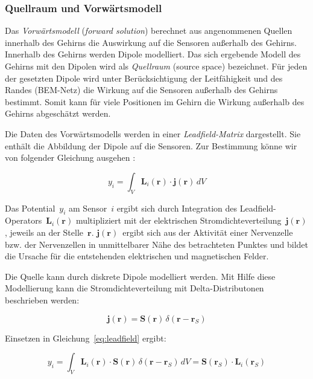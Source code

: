 \documentclass[doc,a4paper,12pt]{apa6}
\newcommand{\mx}[1]{\mathbf{#1}}
\begin{document}
\subsubsection{Quellraum und Vorwärtsmodell}

Das \emph{Vorwärtsmodell} (\emph{forward solution}) berechnet aus angenommenen Quellen innerhalb des Gehirns die Auswirkung auf die Sensoren außerhalb des Gehirns. Innerhalb des Gehirns werden Dipole modelliert. Das sich ergebende Modell des Gehirns mit den Dipolen wird als \emph{Quellraum} (source space) bezeichnet. Für jeden der gesetzten Dipole wird unter Berücksichtigung der Leitfähigkeit und des Randes (BEM-Netz) die Wirkung auf die Sensoren außerhalb des Gehirns bestimmt. Somit kann für viele Positionen im Gehirn die Wirkung außerhalb des Gehirns abgeschätzt werden.

Die Daten des Vorwärtsmodells werden in einer \emph{Leadfield-Matrix} dargestellt. Sie enthält die Abbildung der Dipole auf die Sensoren. Zur Bestimmung könne wir von folgender Gleichung ausgehen \parencite{maurits2011neurology}:

\begin{equation}
y_i = \int_V \mx{L}_i (\mx{r}) \cdot \mx{j} (\mx{r})\, dV
\label{eq:leadfield}
\end{equation}

Das Potential~$y_i$ am Sensor~$i$ ergibt sich durch Integration des Leadfield-Operators~$\mx{L}_i(\mx{r})$ multipliziert mit der elektrischen Stromdichteverteilung~$\mx{j}(\mx{r})$, jeweils an der Stelle~$\mx{r}$. $\mx{j}(\mx{r})$~ergibt sich aus der Aktivität einer Nervenzelle bzw. der Nervenzellen in unmittelbarer Nähe des betrachteten Punktes und bildet die Ursache für die entstehenden elektrischen und magnetischen Felder.

Die Quelle kann durch diskrete Dipole modelliert werden. Mit Hilfe diese Modellierung kann die Stromdichteverteilung mit Delta-Distributonen beschrieben werden:

\begin{equation}
\mx{j} (\mx{r}) = \mx{S}(\mx{r})\,\delta(\mx{r}-\mx{r}_S)
\end{equation}

Einsetzen in Gleichung~\ref{eq:leadfield} ergibt:

\begin{equation}
y_i = \int_V \mx{L}_i (\mx{r}) \cdot \mx{S}(\mx{r})\,\delta(\mx{r}-\mx{r}_S)\, dV = \mx{S}(\mx{r}_S) \cdot \mx{L}_i(\mx{r}_S)
\label{eq:leadfield2}
\end{equation}
\end{document}
